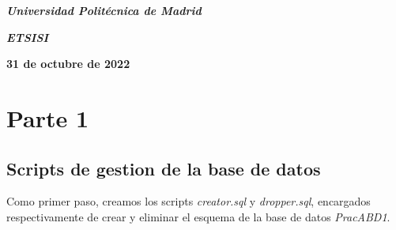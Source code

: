 \documentclass[a4paper, 11pt, oneside]{article} %
\newcommand{\plogo}{\fbox{$\mathcal{LCDPM}$}} %
\begin{document}
\begin{titlepage}
	\vspace{1.0\baselineskip} %
	
	\textit{\textbf{Universidad Politécnica de Madrid \\}} %

	\vspace{0.25\baselineskip} %

	\textit{\textbf{ETSISI}} %
	
	\vfill %
	
	
	\textbf{31 de octubre de 2022} %
	
	\vspace{0.5\baselineskip} %

	\plogo %

\end{titlepage}


\renewcommand*\contentsname{Índice} %

\setcounter{tocdepth}{3} %

\tableofcontents %

\newpage

	
\section{Parte 1}




\subsection{Scripts de gestion de la base de datos}

Como primer paso, creamos los scripts \emph{creator.sql} y \emph{dropper.sql}, encargados respectivamente de crear y eliminar el esquema de la base de datos \emph{PracABD1}.\\
\end{document}
